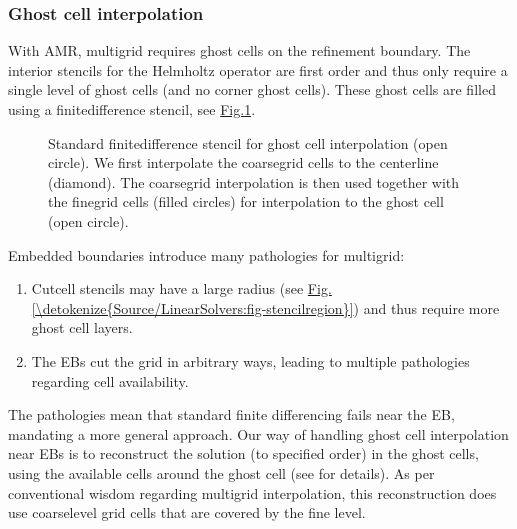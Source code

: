 \documentclass[letterpaper,10pt,english]{sphinxmanual}
\let\sphinxpxdimen\pdfpxdimen\else\newdimen\sphinxpxdimen
\begin{document}
\subsubsection{Ghost cell interpolation}
\label{\detokenize{Source/LinearSolvers:ghost-cell-interpolation}}\label{\detokenize{Source/LinearSolvers:chap-multigridinterpolation}}
\sphinxAtStartPar
With AMR, multigrid requires ghost cells on the refinement boundary.
The interior stencils for the Helmholtz operator are first order and thus only require a single level of ghost cells (and no corner ghost cells).
These ghost cells are filled using a finite\sphinxhyphen{}difference stencil, see \hyperref[\detokenize{Source/LinearSolvers:fig-multigridinterpolation}]{Fig.\@ \ref{\detokenize{Source/LinearSolvers:fig-multigridinterpolation}}}.

\begin{figure}[htb]
\centering
\capstart

\noindent\sphinxincludegraphics[width=360\sphinxpxdimen]{{MultigridInterpolation}.png}
\caption{Standard finite\sphinxhyphen{}difference stencil for ghost cell interpolation (open circle).
We first interpolate the coarse\sphinxhyphen{}grid cells to the centerline (diamond).
The coarse\sphinxhyphen{}grid interpolation is then used together with the fine\sphinxhyphen{}grid cells (filled circles) for interpolation to the ghost cell (open circle).}\label{\detokenize{Source/LinearSolvers:id4}}\label{\detokenize{Source/LinearSolvers:fig-multigridinterpolation}}\end{figure}

\sphinxAtStartPar
Embedded boundaries introduce many pathologies for multigrid:
\begin{enumerate}
%
\item {} 
\sphinxAtStartPar
Cut\sphinxhyphen{}cell stencils may have a large radius (see \hyperref[\detokenize{Source/LinearSolvers:fig-stencilregion}]{Fig.\@ \ref{\detokenize{Source/LinearSolvers:fig-stencilregion}}}) and thus require more ghost cell layers.

\item {} 
\sphinxAtStartPar
The EBs cut the grid in arbitrary ways, leading to multiple pathologies regarding cell availability.

\end{enumerate}

\sphinxAtStartPar
The pathologies mean that standard finite differencing fails near the EB, mandating a more general approach.
Our way of handling ghost cell interpolation near EBs is to reconstruct the solution (to specified order) in the ghost cells, using the available cells around the ghost cell (see {\hyperref[\detokenize{Utilities/LeastSquares:chap-leastsquares}]{}} for details).
As per conventional wisdom regarding multigrid interpolation, this reconstruction does  use coarse\sphinxhyphen{}level grid cells that are covered by the fine level.
\end{document}
